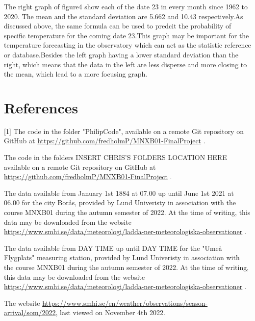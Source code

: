 \documentclass[a4, 12pt]{article}
\begin{document}
The right graph of figure4 show each of the date 23 in every month since 1962 to 2020. The mean and the standard deviation are 5.662 and 10.43 respectively.As discussed above, the same formula can be used to predcit the probability of specific temperature for the coming date 23.This graph may be important for the temperature forecasting in the observatory which can act as the statistic reference or database.Besides the left graph having a lower standard deviation than the right, which means that the data in the left are less disperse and more closing to the mean, which lead to a more focusing graph.





\newpage
\section{References}
[1] The code in the folder "PhilipCode", available on a remote Git repository on GitHub at \href{https://github.com/fredholmP/MNXB01-FinalProject}{https://github.com/fredholmP/MNXB01-FinalProject} . \newline

\noindent [2] The code in the folders INSERT CHRIS'S FOLDERS LOCATION HERE available on a remote Git repository on GitHub at \href{https://github.com/fredholmP/MNXB01-FinalProject}{https://github.com/fredholmP/MNXB01-FinalProject} . \newline

\noindent [3] The data available from January 1st 1884 at 07.00 up until June 1st 2021 at 06.00 for the city Borås, provided by Lund Univeristy in association with the course MNXB01 during the autumn semester of 2022. At the time of writing, this data may be downloaded from the website \href{https://www.smhi.se/data/meteorologi/ladda-ner-meteorologiska-observationer}{https://www.smhi.se/data/meteorologi/ladda-ner-meteorologiska-observationer}  . \newline


\noindent [4] The data available from DAY TIME up until DAY TIME for the "Umeå Flygplats" measuring station, provided by Lund Univeristy in association with the course MNXB01 during the autumn semester of 2022. At the time of writing, this data may be downloaded from the website \href{https://www.smhi.se/data/meteorologi/ladda-ner-meteorologiska-observationer}{https://www.smhi.se/data/meteorologi/ladda-ner-meteorologiska-observationer} . \newline

\noindent [5] The website \href{https://www.smhi.se/en/weather/observations/season-arrival/som/2022}{https://www.smhi.se/en/weather/observations/season-arrival/som/2022}, last viewed on November 4th 2022.
\end{document}
